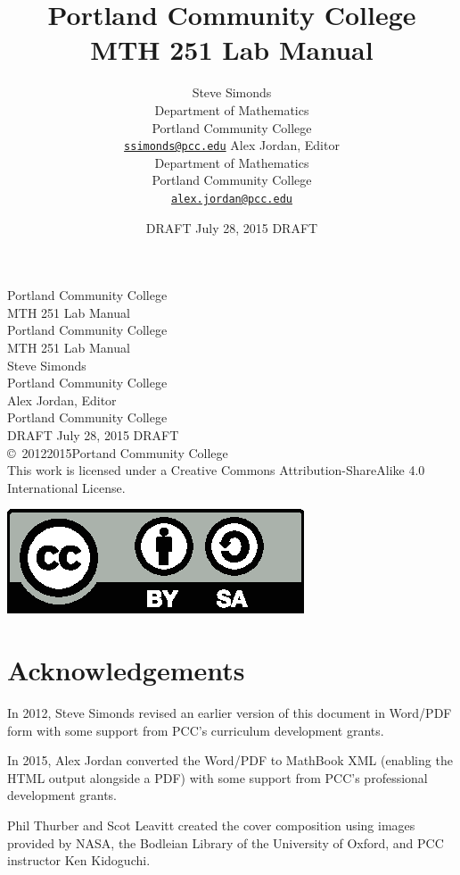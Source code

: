 \documentclass[10pt,oneside,]{book}
\title{Portland Community College\\MTH 251 Lab Manual}
\author{Steve Simonds\\
Department of Mathematics\\
Portland Community College\\
\href{mailto:ssimonds@pcc.edu}{\nolinkurl{ssimonds@pcc.edu}}
Alex Jordan, Editor\\
Department of Mathematics\\
Portland Community College\\
\href{mailto:alex.jordan@pcc.edu}{\nolinkurl{alex.jordan@pcc.edu}}
}
\date{DRAFT July 28, 2015 DRAFT}
\theoremstyle{plain}
\theoremstyle{definition}
\numberwithin{equation}{section}
\begin{document}
\frontmatter
\thispagestyle{empty}
{\centering
\vspace*{0.28\textheight}
{\Huge Portland Community College\\MTH 251 Lab Manual}\\}
\clearpage
\thispagestyle{empty}
\null%
\clearpage
\thispagestyle{empty}
{\centering
\vspace*{0.14\textheight}
{\Huge Portland Community College\\MTH 251 Lab Manual}\\[3\baselineskip]
{\Large Steve Simonds}\\[0.5\baselineskip]
{\Large Portland Community College}\\[3\baselineskip]
{\Large Alex Jordan, Editor}\\[0.5\baselineskip]
{\Large Portland Community College}\\[3\baselineskip]
{\Large DRAFT July 28, 2015 DRAFT}\\}
\clearpage
\thispagestyle{empty}
\noindent\copyright\ 2012\textendash{}2015\quad{}Portand Community College\\[0.5\baselineskip]
This work is licensed under a Creative Commons Attribution-ShareAlike 4.0 International License.%

            \par
\includegraphics[]{../images/by-sa.eps}%
\par
{}
\null\clearpage
\chapter*{Acknowledgements}\label{acknowledgement-1}
In 2012, Steve Simonds revised an earlier version of this document in Word/PDF form with some support from PCC's curriculum development grants.%
\par
In 2015, Alex Jordan converted the Word/PDF to MathBook XML (enabling the HTML output alongside a PDF) with some support from PCC's professional development grants.%
\par
Phil Thurber and Scot Leavitt created the cover composition using images provided by NASA, the Bodleian Library of the University of Oxford, and PCC instructor Ken Kidoguchi.%
\end{document}

